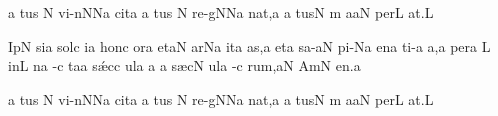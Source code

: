 \bigskip


\Internote
{}
\initiumgregorianum
{}%
\punctum a\egn
\sgn tus%
\punctum N\egn
\spatium
\sgn v{i}{-n}\punctum N\spatiumparvum\epiphonus Na\egn
\sgn cit\punctum a\egn
\spatium
\divisiominima
\spatium
{}\punctum a\egn
\sgn tus%
\punctum N\egn
\spatium
\sgn r{e}{-g}\punctum N\spatiumparvum\epiphonus Na\egn
\sgn na{t,}\punctum a\egn
\spatium
\divisiominima
\spatium
{}\punctum a\egn
\sgn tus\punctum N\egn
\spatium
\sgn {}{\'\i}m%
\punctum a\spatiumparvum\cephalicus aN\egn
\sgn pe{r}\punctum L\egn
\sgn {}a{t.}\punctum L\egn
\spatium
\Finisgregoriana



\Internote
{}
\initiumgregorianum
\sgn { }Ip\punctum N\egn
\sgn si{}\cantores\punctum a\egn
\spatium
\sgn sol\punctum c\egn
\sgn {}i{}\punctum a\egn
\spatium
\sgn hon\punctum c\egn
\sgn {}or\punctum a\egn
\spatium
\sgn {}et\cephalicus aN\egn
\spatium
{}ar\pes Na\egn
\sgn {}it\punctum a\egn
\sgn {}a{s,}\punctum a\egn
\spatium
\divisiominima
\spatium
\sgn {}et\engl{}\punctum a\egn
\spatium
\sgn sa-\clivis aN\egn
\sgn pi-\pes Na\egn
\sgn {}en\punctum a\egn
\sgn ti-\punctum a\egn
\sgn {}a{,}\punctum a\egn
\spatium
\divisiominima
\spatium
\sgn per\punctum a\egn
\spatium
\custos L
\lineaproxima
\sgn {}in\punctum L\egn
{}n\punctum a\egn
\sgn {}{\'\i}-\punctum c\egn
\sgn ta{}\punctum a\egn
\spatium
\sgn s{\'\ae}c\punctum c\egn
\sgn {}ul\punctum a\egn
\sgn {}a{}%
\punctum a\egn
\spatium
\sgn s{\ae}c\punctum N\egn
\sgn {}ul\punctum a\egn
{}-\punctum c\egn
\sgn ru{m,}\cephalicus aN\egn
\spatium
\divisiofinalis
\spatium
\sgn {}Am\punctum N\egn
\sgn {}e{n.}\punctum a\egn
\spatium
\Finisgregoriana

\bigskip


\Internote
{}
\initiumgregorianum
{}%
\punctum a\egn
\sgn tus%
\punctum N\egn
\spatium
\sgn v{i}{-n}\punctum N\spatiumparvum\epiphonus Na\egn
\sgn cit\punctum a\egn
\spatium
\divisiominima
\spatium
{}\punctum a\egn
\sgn tus%
\punctum N\egn
\spatium
\sgn r{e}{-g}\punctum N\spatiumparvum\epiphonus Na\egn
\sgn na{t,}\punctum a\egn
\spatium
\divisiominima
\spatium
{}\punctum a\egn
\sgn tus\punctum N\egn
\spatium
\sgn {}{\'\i}m%
\punctum a\spatiumparvum\cephalicus aN\egn
\sgn pe{r}\punctum L\egn
\sgn {}a{t.}\punctum L\egn
\spatium
\Finisgregoriana





\normmusicsize

